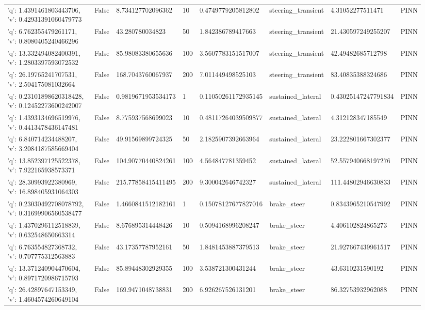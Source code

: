 \begin{tabular}{llllllll}
{'q': 1.4391461803443706, 'v': 0.42931391060479773} & False & 8.734127702096362 & 10 & 0.4749779205812802 & steering\_transient & 4.31052277511471 & PINN \\
{'q': 6.762355479261171, 'v': 0.8080405240466296} & False & 43.280780034823 & 50 & 1.842386789417663 & steering\_transient & 21.430597249255207 & PINN \\
{'q': 13.332494082400391, 'v': 1.2803397593072532} & False & 85.98083380655636 & 100 & 3.5607783151517007 & steering\_transient & 42.49482685712798 & PINN \\
{'q': 26.19765241707531, 'v': 2.504175081032664} & False & 168.7043760067937 & 200 & 7.011449498525103 & steering\_transient & 83.40835388324686 & PINN \\
{'q': 0.23101898620318428, 'v': 0.12452273600242007} & False & 0.9819671953534173 & 1 & 0.11050261172935145 & sustained\_lateral & 0.43025147247791834 & PINN \\
{'q': 1.4393134696519976, 'v': 0.4413478436147481} & False & 8.775937568699023 & 10 & 0.48117264039509877 & sustained\_lateral & 4.312128347185549 & PINN \\
{'q': 6.840714234488207, 'v': 3.2084187585669404} & False & 49.91569899724325 & 50 & 2.1825907392663964 & sustained\_lateral & 23.222801667302377 & PINN \\
{'q': 13.852397125522378, 'v': 7.922165938573371} & False & 104.90770440824261 & 100 & 4.564847781359452 & sustained\_lateral & 52.557940668197276 & PINN \\
{'q': 28.30993922380969, 'v': 16.898405931064303} & False & 215.77858415411495 & 200 & 9.300042646742327 & sustained\_lateral & 111.44802946630833 & PINN \\
{'q': 0.23030492708078792, 'v': 0.31699906560538477} & False & 1.4660841512182161 & 1 & 0.15078127677827016 & brake\_steer & 0.8343965210547992 & PINN \\
{'q': 1.4370296112518839, 'v': 0.632548650663314} & False & 8.676895314448426 & 10 & 0.5094168996208247 & brake\_steer & 4.406102824865273 & PINN \\
{'q': 6.763554827368732, 'v': 0.707775312563883} & False & 43.17357787952161 & 50 & 1.8481453887379513 & brake\_steer & 21.927667439961517 & PINN \\
{'q': 13.371240904470604, 'v': 0.8971720986715793} & False & 85.89448302929355 & 100 & 3.538721300431244 & brake\_steer & 43.6310231590192 & PINN \\
{'q': 26.42897647153349, 'v': 1.4604574260649104} & False & 169.9471048738831 & 200 & 6.926267526131201 & brake\_steer & 86.32753932962088 & PINN \\

\end{tabular}

